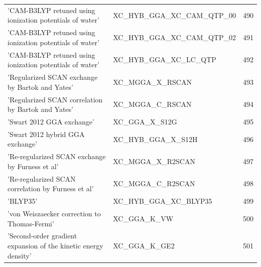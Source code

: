 \documentclass[final,12pt,makeidx,DIV=calc]{article}
\begin{document}
{{{{{{\begin{table}[!h]
\begin{center}
\begin{tabular}{llr}
  'CAM-B3LYP retuned using ionization potentials of water' & XC\_HYB\_GGA\_XC\_CAM\_QTP\_00  &490\\
  'CAM-B3LYP retuned using ionization potentials of water' & XC\_HYB\_GGA\_XC\_CAM\_QTP\_02  &491\\
  'CAM-B3LYP retuned using ionization potentials of water' & XC\_HYB\_GGA\_XC\_LC\_QTP  &492\\
  'Regularized SCAN exchange by Bartok and Yates' & XC\_MGGA\_X\_RSCAN  &493\\
  'Regularized SCAN correlation by Bartok and Yates' & XC\_MGGA\_C\_RSCAN  &494\\
  'Swart 2012 GGA exchange' & XC\_GGA\_X\_S12G  &495\\
  'Swart 2012 hybrid GGA exchange' & XC\_HYB\_GGA\_X\_S12H  &496\\
  'Re-regularized SCAN exchange by Furness et al' & XC\_MGGA\_X\_R2SCAN  &497\\
  'Re-regularized SCAN correlation by Furness et al' & XC\_MGGA\_C\_R2SCAN  &498\\
  'BLYP35' & XC\_HYB\_GGA\_XC\_BLYP35  &499\\
  'von Weiszaecker correction to Thomas-Fermi' & XC\_GGA\_K\_VW  &500\\
  'Second-order gradient expansion of the kinetic energy density' & XC\_GGA\_K\_GE2  &501\\
\end{tabular}
\end{center}
\end{table}

}}}}}}
\end{document}
